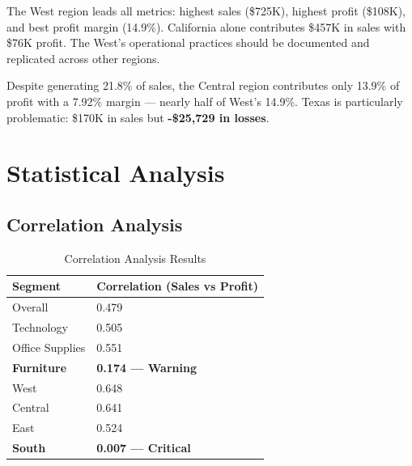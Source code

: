 \documentclass[11pt,a4paper]{article}
\begin{document}
\begin{tcolorbox}[
    colback=profitgreen!5,
    colframe=profitgreen!40,
    title=\textbf{West — The Gold Standard},
    fonttitle=\bfseries,
    arc=6pt
]
The West region leads all metrics: highest sales (\$725K), highest profit (\$108K), and best profit margin (14.9\%). California alone contributes \$457K in sales with \$76K profit. The West's operational practices should be documented and replicated across other regions.
\end{tcolorbox}

\vspace{8pt}

\begin{tcolorbox}[
    colback=warningred!5,
    colframe=warningred!40,
    title=\textbf{Central — Critical Underperformance},
    fonttitle=\bfseries,
    arc=6pt
]
Despite generating 21.8\% of sales, the Central region contributes only 13.9\% of profit with a 7.92\% margin — nearly half of West's 14.9\%. Texas is particularly problematic: \$170K in sales but \textbf{-\$25,729 in losses}.
\end{tcolorbox}

\section{Statistical Analysis}

\subsection{Correlation Analysis}

\begin{table}[H]
\centering
\begin{tabular}{@{}p{4cm} p{4cm}@{}}
\toprule
\rowcolor{primary!10}
\textbf{Segment} & \textbf{Correlation (Sales vs Profit)} \\
\midrule
Overall & 0.479 \\
\midrule
\rowcolor{accent!5}
Technology & 0.505 \\
Office Supplies & 0.551 \\
\rowcolor{warningred!10}
\textbf{Furniture} & \textbf{0.174 — Warning} \\
\midrule
West & 0.648 \\
Central & 0.641 \\
East & 0.524 \\
\rowcolor{warningred!10}
\textbf{South} & \textbf{0.007 — Critical} \\
\bottomrule
\end{tabular}
\caption{Correlation Analysis Results}
\end{table}
\end{document}
